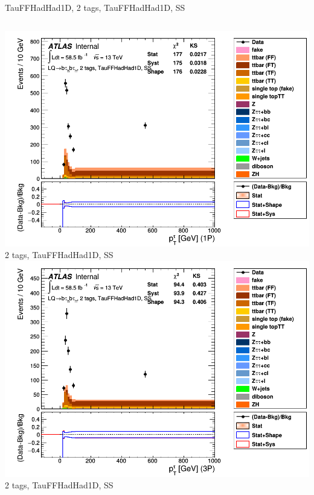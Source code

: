 \begin{frame}{TauFFHadHad1D, 2 tags, TauFFHadHad1D, SS}
  \begin{columns}[c]
    \centering\includegraphics[width=\textwidth]{C_2tag2pjet_0ptv_SS_TauPt1P}\\
    2 tags, TauFFHadHad1D, SS
    \centering\includegraphics[width=\textwidth]{C_2tag2pjet_0ptv_SS_TauPt3P}\\
    2 tags, TauFFHadHad1D, SS
  \end{columns}
  \begin{columns}[c]

\end{columns}
\end{frame}
